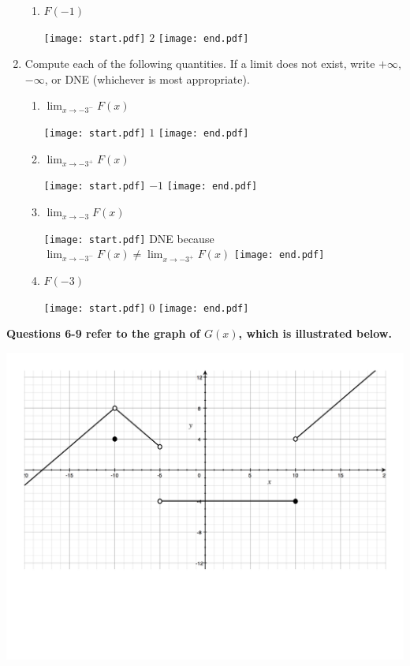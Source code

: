 \documentclass[12pt]{article}
\begin{document}
\begin{enumerate}
\begin{enumerate}
\item $F(-1)$

\texttt{[image: start.pdf]}
{{$2$}}
\texttt{[image: end.pdf]}


\end{enumerate}

\item Compute each of the following quantities.  If a limit does not exist, write $+\infty$, $-\infty$, or DNE (whichever is most appropriate). 

\begin{enumerate}

\item $\displaystyle \lim_{x \rightarrow -3^{-}}{F(x)}$

\texttt{[image: start.pdf]}
{{$1$}}
\texttt{[image: end.pdf]}


\item $\displaystyle \lim_{x \rightarrow -3^{+}}{F(x)}$

\texttt{[image: start.pdf]}
{{$-1$}}
\texttt{[image: end.pdf]}


\item $\displaystyle \lim_{x \rightarrow -3}{F(x)}$

\texttt{[image: start.pdf]}
{{DNE because $\displaystyle \lim_{x \rightarrow -3^{-}}{F(x)} \neq \lim_{x \rightarrow -3^{+}}{F(x)}$}}
\texttt{[image: end.pdf]}


\item $F(-3)$

\texttt{[image: start.pdf]}
{{$0$}}
\texttt{[image: end.pdf]}


\end{enumerate}

\end{enumerate}

\newpage

{\bf Questions 6-9 refer to the graph of $G(x)$, which is illustrated below.}

\begin{center}
\includegraphics[scale=0.5]{Limits2.pdf}
\end{center}
\end{document}
